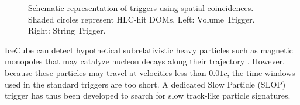 \begin{figure}[ht]
  \centering {}
  \quad
  \caption{Schematic representation of triggers using spatial coincidences.  Shaded circles
    represent HLC-hit DOMs.  Left: Volume Trigger.  Right: String Trigger. }
\end{figure}

IceCube can detect hypothetical subrelativistic heavy
particles such as magnetic monopoles that may catalyze nucleon decays along
their trajectory \cite{Aartsen:2014awd}.  However, because these
particles may travel at velocities less than $0.01c$, the time
windows used in the standard triggers are too short.  A dedicated Slow
Particle (SLOP) trigger has thus been developed to search for slow
track-like particle signatures.

